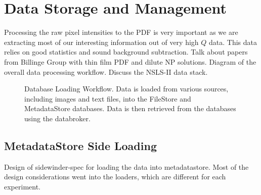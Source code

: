 \section{Data Storage and Management}

Processing the raw pixel intensities to the PDF is very important as we are extracting most of our interesting information out of very high $Q$ data.
This data relies on good statistics and sound background subtraction.
Talk about papers from Billinge Group with thin film PDF and dilute NP solutions.
Diagram of the overall data processing workflow.
Discuss the NSLS-II data stack.
\begin{figure}
\centering
{}
\caption{Database Loading Workflow. Data is loaded from various sources, including images and text files, into the FileStore and MetadataStore databases. Data is then retrieved from the databases using the databroker.}
\end{figure}
\subsection{MetadataStore Side Loading}
Design of sidewinder-spec for loading the data into metadatastore.
Most of the design considerations went into the loaders, which are different for each experiment.